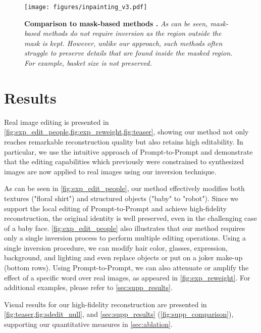 \begin{figure}
\centering 
\vspace{-0.5cm}
\texttt{[image: figures/inpainting\_v3.pdf]} 

\vspace{-0.2cm}
\caption{{\bf Comparison to mask-based methods .} {\it As can be seen, mask-based methods do not require inversion as the region outside the mask is kept. However, unlike our approach, such methods often struggle to preserve details that are found inside the masked region. For example, basket size is not preserved. } } 
\vspace{-0.4cm}
\label{fig:exp_inaint} 

\end{figure} 

\section{Results}
\label{sec:results}



Real image editing is presented in \cref{fig:exp_edit_people,fig:exp_reweight,fig:teaser}, showing our method not only reaches remarkable reconstruction quality but also retains high editability. In particular, we use the intuitive approach of Prompt-to-Prompt \cite{hertz2022prompt} and demonstrate that the editing capabilities which previously were constrained to synthesized images are now applied to real images using our inversion technique.



As can be seen in \cref{fig:exp_edit_people}, our method effectively modifies both textures ("floral shirt") and structured objects ("baby" to "robot"). Since we support the local editing of Prompt-to-Prompt and achieve high-fidelity reconstruction, the original identity is well preserved, even in the challenging case of a baby face.
\cref{fig:exp_edit_people} also illustrates that our method requires only a single inversion process to perform multiple editing operations. Using a single inversion procedure, we can modify hair color, glasses, expression, background, and lighting and even replace objects or put on a joker make-up (bottom rows). Using Prompt-to-Prompt, we can also attenuate or amplify the effect of a specific word over real images, as appeared in \cref{fig:exp_reweight}.
For additional examples, please refer to \cref{sec:supp_results}.


Visual results for our high-fidelity reconstruction are presented in \cref{fig:teaser,fig:sdedit_null}, and \cref{sec:supp_results} (\cref{fig:supp_comparison}), supporting our quantitative measures in \cref{sec:ablation}.






